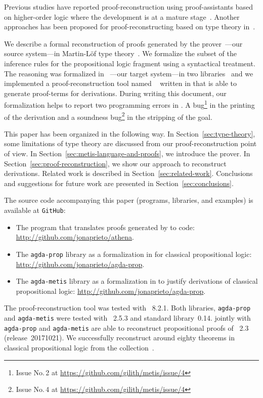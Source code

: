 \documentclass[../main.tex]{subfiles}
\begin{document}
Previous studies have reported proof-reconstruction using
proof-assistants based on higher-order logic where the development is at a mature
stage~\cite{paulson2010three,hurlin07practical,kaliszyk2013}.
Another approaches has been proposed for proof-reconstructing based
on type theory in~\cite{Bezem2002,kanso2016light,Keller2013}.

We describe a formal reconstruction of proofs generated by the \Metis
prover~\cite{hurd2003first}---our source system---in Martin-Löf type
theory~\cite{Nordstrom-Petersson-Smith-1990}. We
formalize the subset of the \Metis inference rules for the
propositional logic fragment using a syntactical treatment.
The \Metis reasoning was formalized in
\Agda~\cite{agdateam}---our target system---in two
libraries~\cite{AgdaProp,AgdaMetis} and we implemented a
proof-reconstruction tool named \Athena~\cite{Athena} written in
\Haskell that is able to generate \Agda proof-terms for \Metis
derivations. During writing this document, our formalization helps to report two programming errors in \Metis.
A bug\footnote{Issue No.\,2 at \url{https://github.com/gilith/metis/issue/4}} in the printing of the derivation and a soundness bug\footnote{Issue No.\,4 at \url{https://github.com/gilith/metis/issue/4}} in the stripping of the goal.


This paper has been organized in the following way.  In
Section~\ref{sec:type-theory}, some limitations of type theory are
discussed from our proof-reconstruction point of view.  In
Section~\ref{sec:metis-language-and-proofs}, we introduce the \Metis
prover.  In Section~\ref{sec:proof-reconstruction}, we show our
approach to reconstruct \Metis derivations.  Related work is described in
Section~\ref{sec:related-work}.  Conclusions and suggestions for
future work are presented in Section~\ref{sec:conclusions}.

The source code accompanying this paper (programs, libraries, and
examples) is available at \verb!GitHub!:

\begin{itemize}
  \item The \Athena program that translates proofs generated by \Metis
  to \Agda code: \url{http://github.com/jonaprieto/athena}.

  \item The \verb!agda-prop! library as a formalization in \Agda for
    classical propositional logic:
  \url{http://github.com/jonaprieto/agda-prop}.

  \item The \verb!agda-metis! library as a formalization in \Agda to
  justify \Metis derivations of classical propositional logic:
  \url{http://github.com/jonaprieto/agda-prop}.

\end{itemize}


The proof-reconstruction tool \Athena was tested with ~8.2.1.
Both libraries, \verb!agda-prop! and \verb!agda-metis! were tested with
\Agda~2.5.3 and \Agda standard library~0.14.
\Athena jointly with \verb!agda-prop! and \verb!agda-metis! are able to reconstruct propositional proofs of \Metis~2.3 (release~20171021).
We successfully reconstruct around eighty theorems in classical propositional logic from the \TPTP
collection~\cite{Prieto-Cubides2017}.
\end{document}
